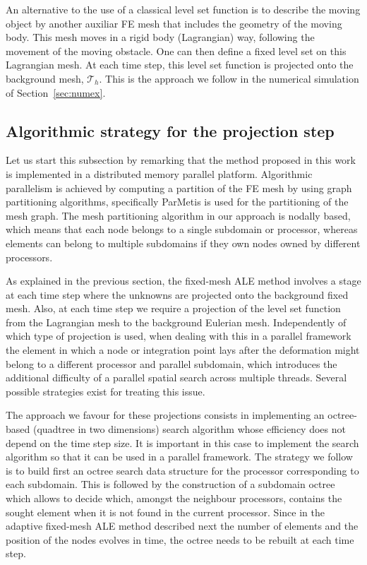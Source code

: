 \documentclass[11pt,a4paper,oneside,reqno]{amsart}
\begin{document}
An alternative to the use of a classical level set function is to describe the moving object by another auxiliar FE mesh that includes the geometry of the
moving body. This mesh moves in a rigid body (Lagrangian) way, following the movement of the moving obstacle. One can then define a fixed level set on this Lagrangian mesh. At each time step, this level set function is projected onto the background mesh, $\mathcal{T}_h$. This is the approach we follow in the numerical simulation of Section~\ref{sec:numex}.

\subsection{Algorithmic strategy for the projection step}

Let us start this subsection by remarking that the method proposed in
this work is implemented in a distributed memory parallel platform.
Algorithmic parallelism is achieved by computing a partition of the
FE mesh by using graph partitioning algorithms, specifically
ParMetis \cite{Karypis1997ParmetisPG} is used for the partitioning of the mesh graph.
The mesh partitioning algorithm in our approach is nodally based,
which means that each node belongs to a single subdomain or processor,
whereas elements can belong to multiple subdomains if they own nodes
owned by different processors. 

As explained in the previous section, the fixed-mesh ALE method involves
a stage at each time step where the unknowns are projected onto the
background fixed mesh. Also, at each time step we require a projection
of the level set function from the Lagrangian mesh to the background
Eulerian mesh. Independently of which type of projection
is used, when dealing with this in a parallel framework the element
in which a node or integration point lays after the deformation might
belong to a different processor and parallel subdomain, which introduces
the additional difficulty of a parallel spatial search across multiple
threads. Several possible strategies exist for treating this issue.

The approach we favour for these projections consists in implementing
an octree-based (quadtree in two dimensions) search algorithm whose
efficiency does not depend on the time step size. It is important
in this case to implement the search algorithm so that it can be used
in a parallel framework. The strategy we follow is to build first
an octree search data structure for the processor corresponding to
each subdomain. This is followed by the construction of a subdomain
octree which allows to decide which, amongst the neighbour processors,
contains the sought element when it is not found in the current processor.
Since in the adaptive fixed-mesh ALE method described next the number of elements
and the position of the nodes evolves in time, the octree needs to
be rebuilt at each time step. 
\end{document}
